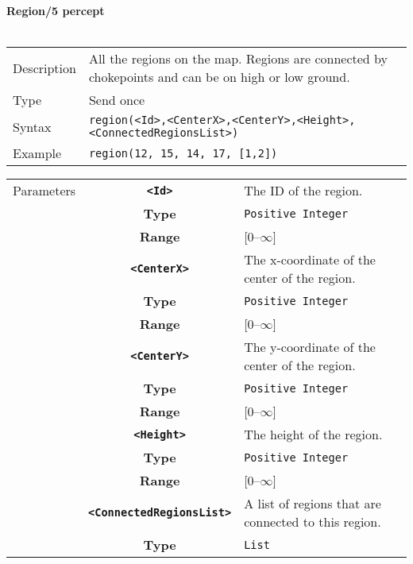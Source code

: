 \noindent
\textbf{Region/5 percept}\\
\\
\begin{tabularx}{\textwidth}{lX}
 Description & All the regions on the map. Regions are connected by chokepoints and can be on high or low ground. \\
 Type & Send once \\
 Syntax & \verb|region(<Id>,<CenterX>,<CenterY>,<Height>,<ConnectedRegionsList>)| \\
 Example & \verb|region(12, 15, 14, 17, [1,2])| \\
 \end{tabularx}
 \begin{tabularx}{\textwidth}{l | c | p{8cm}|}
 \cline{2-3}
 Parameters & \textbf{\verb|<Id>|} & The ID of the region.\\
            & \textbf{Type} & \verb|Positive Integer| \\
            & \textbf{Range} & [0--$\infty$] \\
            \cline{2-3}
            & \textbf{\verb|<CenterX>|} & The x-coordinate of the center of the region.\\
            & \textbf{Type} & \verb|Positive Integer| \\
            & \textbf{Range} & [0--$\infty$] \\
            \cline{2-3}
            & \textbf{\verb|<CenterY>|} & The y-coordinate of the center of the region.\\
            & \textbf{Type} & \verb|Positive Integer| \\
            & \textbf{Range} & [0--$\infty$] \\
            \cline{2-3}
            & \textbf{\verb|<Height>|} & The height of the region.\\
            & \textbf{Type} & \verb|Positive Integer| \\
            & \textbf{Range} & [0--$\infty$] \\
            \cline{2-3}
            & \textbf{\verb|<ConnectedRegionsList>|} & A list of regions that are connected to this region.\\
            & \textbf{Type} & \verb|List| \\
            \cline{2-3}
\end{tabularx}\\

